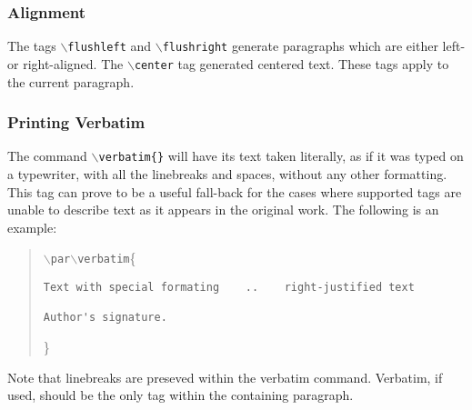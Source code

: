 \documentclass[11pt]{article}
\newcommand{\cmd}[1]{{\tt $\backslash$#1}}
\begin{document}


\subsubsection{Alignment}

The tags \cmd{flushleft} and \cmd{flushright} generate paragraphs
which are either left- or right-aligned. The \cmd{center} tag
generated centered text. These tags apply to the current paragraph.



\subsubsection{Printing Verbatim}

The command \cmd{verbatim\{\}} will have its text taken literally, as
if it was typed on a typewriter, with all the linebreaks and spaces,
without any other formatting. This tag can prove to be a useful
fall-back for the cases where supported tags are unable to describe
text as it appears in the original work. The following is an example:

\begin{quote}
  \cmd{par}\cmd{verbatim}\{
\begin{verbatim}
Text with special formating    ..    right-justified text

Author's signature.
\end{verbatim}
\}
\end{quote}

\noindent Note that linebreaks are preseved within the verbatim
command. Verbatim, if used, should be the only tag within the
containing paragraph.
\end{document}

